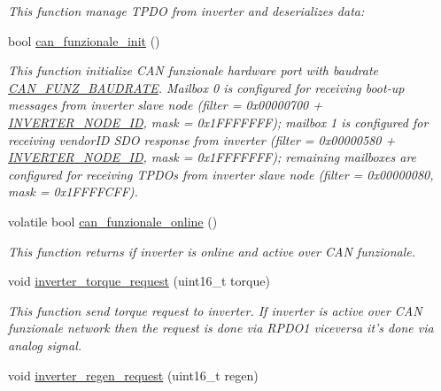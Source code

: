 \begin{DoxyCompactItemize}
\begin{DoxyCompactList}\small\item\em This function manage T\-P\-D\-O from inverter and deserializes data\-: \end{DoxyCompactList}\item 
bool \hyperlink{group___c_a_n__funzionale__group_ga578b28192b0c78942fcc0452d070accb}{can\-\_\-funzionale\-\_\-init} ()
\begin{DoxyCompactList}\small\item\em This function initialize C\-A\-N funzionale hardware port with baudrate \hyperlink{common_8h_adee7e3800c996a5a977034531d94570d}{C\-A\-N\-\_\-\-F\-U\-N\-Z\-\_\-\-B\-A\-U\-D\-R\-A\-T\-E}. Mailbox 0 is configured for receiving boot-\/up messages from inverter slave node (filter = 0x00000700 + \hyperlink{group___c_a_n__funzionale__group_ga59ea82aec4abe07072cbdad555a8c1b9}{I\-N\-V\-E\-R\-T\-E\-R\-\_\-\-N\-O\-D\-E\-\_\-\-I\-D}, mask = 0x1\-F\-F\-F\-F\-F\-F\-F); mailbox 1 is configured for receiving vendor\-I\-D S\-D\-O response from inverter (filter = 0x00000580 + \hyperlink{group___c_a_n__funzionale__group_ga59ea82aec4abe07072cbdad555a8c1b9}{I\-N\-V\-E\-R\-T\-E\-R\-\_\-\-N\-O\-D\-E\-\_\-\-I\-D}, mask = 0x1\-F\-F\-F\-F\-F\-F\-F); remaining mailboxes are configured for receiving T\-P\-D\-Os from inverter slave node (filter = 0x00000080, mask = 0x1\-F\-F\-F\-F\-C\-F\-F). \end{DoxyCompactList}\item 
volatile bool \hyperlink{group___c_a_n__funzionale__group_ga7d74fd826c5df3b86fd751f91c61671f}{can\-\_\-funzionale\-\_\-online} ()
\begin{DoxyCompactList}\small\item\em This function returns if inverter is online and active over C\-A\-N funzionale. \end{DoxyCompactList}\item 
void \hyperlink{group___c_a_n__funzionale__group_ga41854ab275f2b3cb7efb9385502d7d65}{inverter\-\_\-torque\-\_\-request} (uint16\-\_\-t torque)
\begin{DoxyCompactList}\small\item\em This function send torque request to inverter. If inverter is active over C\-A\-N funzionale network then the request is done via R\-P\-D\-O1 viceversa it's done via analog signal. \end{DoxyCompactList}\item 
void \hyperlink{group___c_a_n__funzionale__group_ga75820e0d72b7f264a70d99f414745518}{inverter\-\_\-regen\-\_\-request} (uint16\-\_\-t regen)

\end{DoxyCompactItemize}
